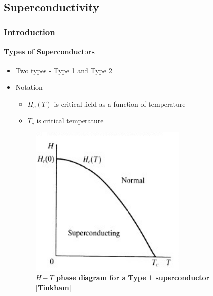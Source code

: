 \documentclass[12pt]{beamer}
\begin{document}
\subsection{Superconductivity}
\begin{frame}
\frametitle{Introduction}
\framesubtitle{Types of Superconductors}


\begin{itemize}

  \item Two types - Type 1 and Type 2

  \pause

  \item Notation

  \pause

  \begin{itemize}
    \item \(H_c (T)\) is critical field as a function of temperature
    \pause
    \item \(T_c\) is critical temperature
  \end{itemize}

  \pause

  \begin{figure}[h]
    \includegraphics[scale = 0.5]{Type1.png}
    \caption{\textbf{\(H-T\) phase diagram for a Type 1 superconductor [Tinkham]}}
  \end{figure}

\end{itemize}


\end{frame}
\end{document}
